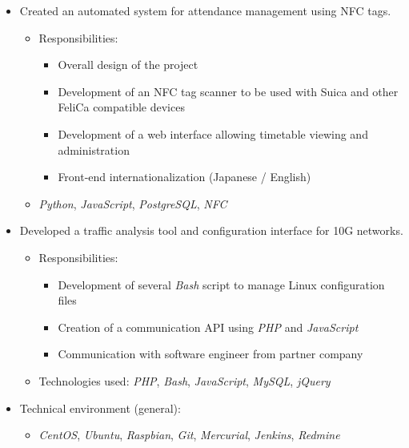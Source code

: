 \documentclass[11pt,a4paper,sans]{moderncv}
\providecommand{\techno}{}
\renewcommand{\techno}{\emph}
\providecommand{\lang}{}
\renewcommand{\lang}{\emph}
\begin{document}
{\begin{itemize}
\begin{itemize}
            \begin{itemize}%
                \item Development of network protocol modules used for network testing (\techno{HTTP}, \techno{FTP}, \techno{ICMP}, \techno{SIP}, \techno{RTP})
            \end{itemize}
        \item Technologies used: \lang{C++}, \techno{Boost}
    \end{itemize}
\item Created an automated system for attendance management using NFC tags.
    \begin{itemize}%
        \item Responsibilities:
            \begin{itemize}%
                \item Overall design of the project
                \item Development of an NFC tag scanner to be used with Suica and other FeliCa compatible devices
                \item Development of a web interface allowing timetable viewing and administration
                \item Front-end internationalization (Japanese / English)
            \end{itemize}
        \item \lang{Python}, \lang{JavaScript}, \techno{PostgreSQL}, \techno{NFC}
    \end{itemize}
\ifdefined\detailed%
\item Developed a traffic analysis tool and configuration interface for 10G networks.
    \begin{itemize}%
        \item Responsibilities:
            \begin{itemize}%
                \item Development of several \lang{Bash} script to manage Linux configuration files
                \item Creation of a communication API using \lang{PHP} and \lang{JavaScript}
                \item Communication with software engineer from partner company
            \end{itemize}
        \item Technologies used: \lang{PHP}, \lang{Bash}, \lang{JavaScript}, \techno{MySQL}, \techno{jQuery}
    \end{itemize}
\item Technical environment (general):
    \begin{itemize}%
        \item \techno{CentOS}, \techno{Ubuntu}, \techno{Raspbian}, \techno{Git}, \techno{Mercurial}, \techno{Jenkins}, \techno{Redmine}
    \end{itemize}
\fi
\end{itemize}
}
\end{document}
